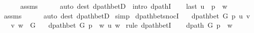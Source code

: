 \begin{isabellebody}
\ \ \ \ \isamarkupfalse%
\ assms\isanewline
\ \ \ \ \isamarkupfalse%
\ {\isacharparenleft}{\kern0pt}auto\ dest{\isacharcolon}{\kern0pt}\ dpath{\isacharunderscore}{\kern0pt}betD{\isacharparenleft}{\kern0pt}{}{\isacharcomma}{\kern0pt}\ {}{\isacharparenright}{\kern0pt}\ intro{\isacharcolon}{\kern0pt}\ dpathI{\isacharparenright}{\kern0pt}\isanewline
\ \ \isamarkupfalse%
\ {\isachardoublequoteopen}last\ {\isacharparenleft}{\kern0pt}u\ {\isacharhash}{\kern0pt}\ p{\isacharparenright}{\kern0pt}\ {\isacharequal}{\kern0pt}\ w{\isachardoublequoteclose}\isanewline
\ \ \ \ \isamarkupfalse%
\ assms{\isacharparenleft}{\kern0pt}{}{\isacharparenright}{\kern0pt}\isanewline
\ \ \ \ \isamarkupfalse%
\ {\isacharparenleft}{\kern0pt}auto\ dest{\isacharcolon}{\kern0pt}\ dpath{\isacharunderscore}{\kern0pt}betD{\isacharparenleft}{\kern0pt}{}{\isacharparenright}{\kern0pt}{\isacharparenright}{\kern0pt}\isanewline
{}\isamarkupfalse%
\ simp{\isacharplus}{\kern0pt}%
\endisatagproof
{\isafoldproof}%
%
\isadelimproof
\isanewline
%
\endisadelimproof
%
\isadeliminvisible
\isanewline
%
\endisadeliminvisible
%
\isataginvisible
{}\isamarkupfalse%
\ dpath{\isacharunderscore}{\kern0pt}bet{\isacharunderscore}{\kern0pt}snocI{\isacharcolon}{\kern0pt}\isanewline
\ \ \ {\isachardoublequoteopen}dpath{\isacharunderscore}{\kern0pt}bet\ G\ p\ u\ v{\isachardoublequoteclose}\isanewline
\ \ \ {\isachardoublequoteopen}{\isacharparenleft}{\kern0pt}v{\isacharcomma}{\kern0pt}\ w{\isacharparenright}{\kern0pt}\ {\isasymin}\ G{\isachardoublequoteclose}\isanewline
\ \ \ {\isachardoublequoteopen}dpath{\isacharunderscore}{\kern0pt}bet\ G\ {\isacharparenleft}{\kern0pt}p\ {\isacharat}{\kern0pt}\ {\isacharbrackleft}{\kern0pt}w{\isacharbrackright}{\kern0pt}{\isacharparenright}{\kern0pt}\ u\ w{\isachardoublequoteclose}%
\endisataginvisible
{\isafoldinvisible}%
%
\isadeliminvisible
\isanewline
%
\endisadeliminvisible
%
\isadelimproof
%
\endisadelimproof
%
\isatagproof
{}\isamarkupfalse%
\ {\isacharparenleft}{\kern0pt}rule\ dpath{\isacharunderscore}{\kern0pt}betI{\isacharparenright}{\kern0pt}\isanewline
\ \ \isamarkupfalse%
\ {\isachardoublequoteopen}dpath\ G\ {\isacharparenleft}{\kern0pt}p\ {\isacharat}{\kern0pt}\ {\isacharbrackleft}{\kern0pt}w{\isacharbrackright}{\kern0pt}{\isacharparenright}{\kern0pt}{\isachardoublequoteclose}\isanewline
\ \ \ \ \isamarkupfalse%

\end{isabellebody}
